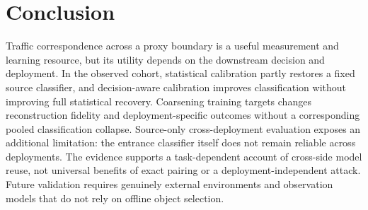 \documentclass[journal]{IEEEtran}
\begin{document}
\section{Conclusion}
Traffic correspondence across a proxy boundary is a useful measurement and learning resource, but its utility depends on the downstream decision and deployment. In the observed cohort, statistical calibration partly restores a fixed source classifier, and decision-aware calibration improves classification without improving full statistical recovery. Coarsening training targets changes reconstruction fidelity and deployment-specific outcomes without a corresponding pooled classification collapse. Source-only cross-deployment evaluation exposes an additional limitation: the entrance classifier itself does not remain reliable across deployments. The evidence supports a task-dependent account of cross-side model reuse, not universal benefits of exact pairing or a deployment-independent attack. Future validation requires genuinely external environments and observation models that do not rely on offline object selection.


\end{document}
